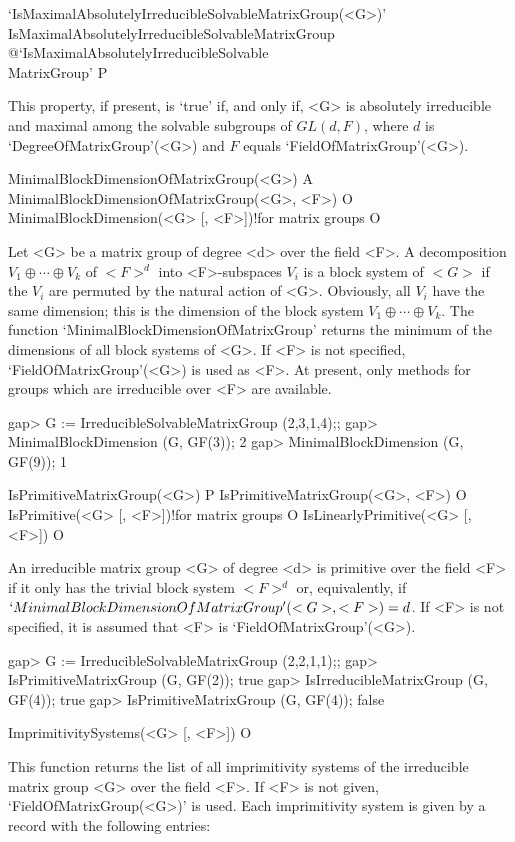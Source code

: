 \>`IsMaximalAbsolutelyIrreducibleSolvableMatrixGroup(<G>)'%
{IsMaximalAbsolutelyIrreducibleSolvableMatrixGroup}%
@{`IsMaximalAbsolutelyIrreducibleSolvable\\MatrixGroup'} P

This property, if present, is `true' if, and only if, <G> is absolutely irreducible and maximal among 
the solvable subgroups of $GL(d, F)$, where $d$ is `DegreeOfMatrixGroup'(<G>) and
$F$ equals `FieldOfMatrixGroup'(<G>). 


\>MinimalBlockDimensionOfMatrixGroup(<G>) A
\>MinimalBlockDimensionOfMatrixGroup(<G>, <F>) O
\>MinimalBlockDimension(<G> [, <F>])!{for matrix groups} O

Let <G> be a matrix group of degree <d> over the field <F>.  A 
decomposition $V_1 \oplus \cdots \oplus V_k$ of $<F>^d$ into <F>-subspaces
$V_i$ is a block system of $<G>$ if the $V_i$ are permuted by the natural
action of <G>. Obviously, all $V_i$ have the same dimension; this is the
dimension of the block system
$V_1 \oplus \cdots \oplus V_k$. The function
`MinimalBlockDimensionOfMatrixGroup' returns the minimum of the dimensions
of all block systems of <G>. If <F> is not specified, `FieldOfMatrixGroup'(<G>)
 is used as <F>. At present, only methods for groups 
which are irreducible over <F> are available.

\beginexample
gap> G := IrreducibleSolvableMatrixGroup (2,3,1,4);;
gap> MinimalBlockDimension (G, GF(3));
2
gap> MinimalBlockDimension (G, GF(9));
1
\endexample

\>IsPrimitiveMatrixGroup(<G>) P
\>IsPrimitiveMatrixGroup(<G>, <F>) O
\>IsPrimitive(<G> [, <F>])!{for matrix groups} O
\>IsLinearlyPrimitive(<G> [, <F>]) O

An irreducible matrix group <G> of degree <d> is primitive over the field <F> if it
only has the trivial block system $<F>^d$ or, equivalently, if
$`MinimalBlockDimensionOfMatrixGroup'(<G>, <F>) = d$. If <F> is not
specified, it is assumed that <F> is `FieldOfMatrixGroup'(<G>).

\beginexample
gap> G := IrreducibleSolvableMatrixGroup (2,2,1,1);;
gap> IsPrimitiveMatrixGroup (G, GF(2));
true
gap> IsIrreducibleMatrixGroup (G, GF(4));
true
gap> IsPrimitiveMatrixGroup (G, GF(4));
false
\endexample

\>ImprimitivitySystems(<G> [, <F>]) O

This function returns the list of all imprimitivity systems of the 
irreducible matrix group <G> over the field <F>. If <F> is not given, 
`FieldOfMatrixGroup(<G>)' is used. 
Each imprimitivity system is given by a record with the following entries:


